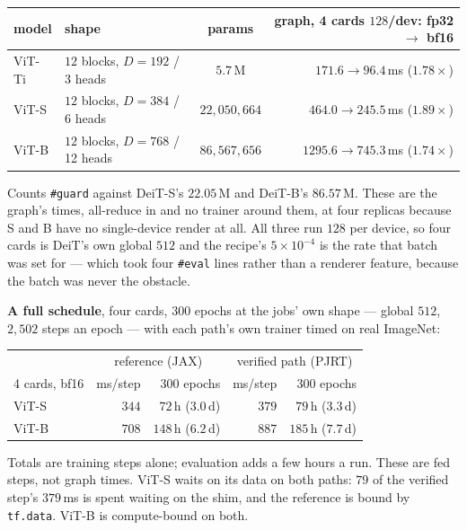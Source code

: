 \begin{center}
\begin{tabular}{@{}l l c r@{}}
\hline
model & shape & params & graph, 4 cards $128$/dev: fp32 $\to$ bf16 \\
\hline
ViT-Ti & $12$ blocks, $D{=}192$ / 3 heads  & $5.7$\,M         & $171.6 \to 96.4$\,ms \;($1.78\times$) \\
ViT-S  & $12$ blocks, $D{=}384$ / 6 heads  & $22{,}050{,}664$ & $464.0 \to 245.5$\,ms \;($\mathbf{1.89\times}$) \\
ViT-B  & $12$ blocks, $D{=}768$ / 12 heads & $86{,}567{,}656$ & $1295.6 \to 745.3$\,ms \;($1.74\times$) \\
\hline
\end{tabular}
\end{center}

\noindent Counts \texttt{\#guard} against DeiT-S's $22.05$\,M and DeiT-B's
$86.57$\,M. These are the graph's times, all-reduce in and no trainer around
them, at four replicas because S and B have no single-device render at all. All
three run $128$ per device, so four cards is DeiT's own global $512$ and the
recipe's $5\times10^{-4}$ is the rate that batch was set for --- which took four
\texttt{\#eval} lines rather than a renderer feature, because the batch was
never the obstacle.

\medskip\noindent \textbf{A full schedule}, four cards, $300$ epochs at the
jobs' own shape --- global $512$, $2{,}502$ steps an epoch --- with each
path's own trainer timed on real ImageNet:

\begin{center}
\begin{tabular}{@{}l r r r r@{}}
\hline
 & \multicolumn{2}{c}{reference (JAX)} & \multicolumn{2}{c}{verified path (PJRT)} \\
4 cards, bf16 & ms/step & 300 epochs & ms/step & 300 epochs \\
\hline
ViT-S & $344$ & $72$\,h \;($3.0$\,d)  & $379$ & $79$\,h \;($3.3$\,d) \\
ViT-B & $708$ & $148$\,h \;($6.2$\,d) & $887$ & $185$\,h \;($7.7$\,d) \\
\hline
\end{tabular}
\end{center}

\noindent Totals are training steps alone; evaluation adds a few hours a
run. These are fed steps, not graph times. ViT-S waits on its data on both
paths: $79$ of the verified step's $379$\,ms is spent waiting on the shim,
and the reference is bound by \texttt{tf.data}. ViT-B is compute-bound on
both.

